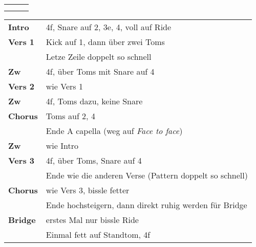 

\begin{tabular}{p{0.6cm}p{12cm}p{1.4cm}}
	\rowcolor{cyan} \myRow{\thesongnumber} & \myRow{Every Step} & \myRow{104} \\
	                                       &                    &             \\
\end{tabular}

\begin{tabular}{p{1.6cm}l}
	\textbf{Intro}  & 4f, Snare auf 2, 3e, 4, voll auf Ride                            \\
	\textbf{Vers 1} & Kick auf 1, dann über zwei Toms                                  \\
	                & Letze Zeile doppelt so schnell                                   \\
	\textbf{Zw}     & 4f, über Toms mit Snare auf 4                                    \\
	\textbf{Vers 2} & wie Vers 1                                                       \\
	\textbf{Zw}     & 4f, Toms dazu, keine Snare                                       \\
	\textbf{Chorus} & Toms auf 2, 4                                                    \\
	                & Ende A capella (weg auf \textit{Face to face})                   \\
	\textbf{Zw}     & wie Intro                                                        \\
	\textbf{Vers 3} & 4f, über Toms, Snare auf 4                                       \\
	                & Ende wie die anderen Verse (Pattern doppelt so schnell)          \\
	\textbf{Chorus} & wie Vers 3, bissle fetter                                        \\
	                & Ende hochsteigern, dann direkt ruhig werden für Bridge           \\
	\textbf{Bridge} & erstes Mal nur bissle Ride                                       \\
	                & Einmal fett auf Standtom, 4f                                     \\

\end{tabular}
